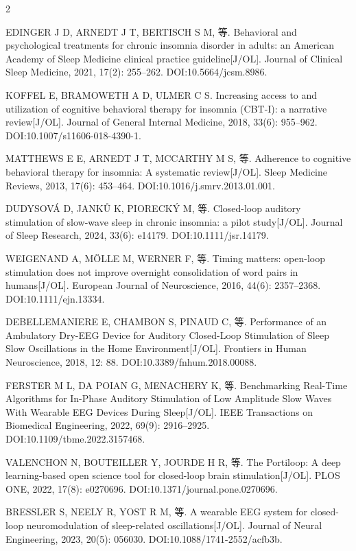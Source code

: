\documentclass[UTF8,zihao=5,fontset=none]{ctexart}
\begin{document}
\begin{multicols}{2}
{\makebox[25.2pt][l]{[9]}EDINGER J D, ARNEDT J T, BERTISCH S M, 等. Behavioral and psychological treatments for chronic insomnia disorder in adults: an American Academy of Sleep Medicine clinical practice guideline[J/OL]. Journal of Clinical Sleep Medicine, 2021, 17(2): 255--262. DOI:10.5664/jcsm.8986.\par
\makebox[25.2pt][l]{[10]}KOFFEL E, BRAMOWETH A D, ULMER C S. Increasing access to and utilization of cognitive behavioral therapy for insomnia (CBT-I): a narrative review[J/OL]. Journal of General Internal Medicine, 2018, 33(6): 955--962. DOI:10.1007/s11606-018-4390-1.\par
\makebox[25.2pt][l]{[11]}MATTHEWS E E, ARNEDT J T, MCCARTHY M S, 等. Adherence to cognitive behavioral therapy for insomnia: A systematic review[J/OL]. Sleep Medicine Reviews, 2013, 17(6): 453--464. DOI:10.1016/j.smrv.2013.01.001.\par
\makebox[25.2pt][l]{[12]}DUDYSOVÁ D, JANKŮ K, PIORECKÝ M, 等. Closed-loop auditory stimulation of slow-wave sleep in chronic insomnia: a pilot study[J/OL]. Journal of Sleep Research, 2024, 33(6): e14179. DOI:10.1111/jsr.14179.\par
\makebox[25.2pt][l]{[13]}WEIGENAND A, MÖLLE M, WERNER F, 等. Timing matters: open-loop stimulation does not improve overnight consolidation of word pairs in humans[J/OL]. European Journal of Neuroscience, 2016, 44(6): 2357--2368. DOI:10.1111/ejn.13334.\par
\makebox[25.2pt][l]{[14]}DEBELLEMANIERE E, CHAMBON S, PINAUD C, 等. Performance of an Ambulatory Dry-EEG Device for Auditory Closed-Loop Stimulation of Sleep Slow Oscillations in the Home Environment[J/OL]. Frontiers in Human Neuroscience, 2018, 12: 88. DOI:10.3389/fnhum.2018.00088.\par
\makebox[25.2pt][l]{[15]}FERSTER M L, DA POIAN G, MENACHERY K, 等. Benchmarking Real-Time Algorithms for In-Phase Auditory Stimulation of Low Amplitude Slow Waves With Wearable EEG Devices During Sleep[J/OL]. IEEE Transactions on Biomedical Engineering, 2022, 69(9): 2916--2925. DOI:10.1109/tbme.2022.3157468.\par
\makebox[25.2pt][l]{[16]}VALENCHON N, BOUTEILLER Y, JOURDE H R, 等. The Portiloop: A deep learning-based open science tool for closed-loop brain stimulation[J/OL]. PLOS ONE, 2022, 17(8): e0270696. DOI:10.1371/journal.pone.0270696.\par
\makebox[25.2pt][l]{[17]}BRESSLER S, NEELY R, YOST R M, 等. A wearable EEG system for closed-loop neuromodulation of sleep-related oscillations[J/OL]. Journal of Neural Engineering, 2023, 20(5): 056030. DOI:10.1088/1741-2552/acfb3b.\par
}
\end{multicols}
\end{document}
